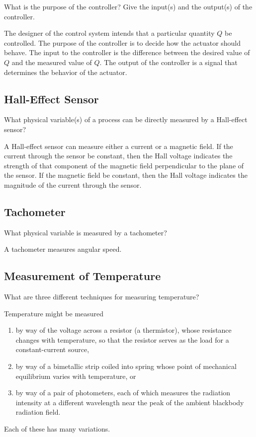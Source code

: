 \begin{prob}
   What is the purpose of the controller? Give the input(s) and the output(s)
   of the controller.
\end{prob}

The designer of the control system intends that a particular quantity $Q$ be
controlled. The purpose of the controller is to decide how the actuator should
behave. The input to the controller is the difference between the desired value
of $Q$ and the measured value of $Q$.  The output of the controller is a signal
that determines the behavior of the actuator.

\subsection{Hall-Effect Sensor}

\begin{prob}
   What physical variable(s) of a process can be directly measured by a
   Hall-effect sensor?
\end{prob}

A Hall-effect sensor can measure either a current or a magnetic field. If the
current through the sensor be constant, then the Hall voltage indicates the
strength of that component of the magnetic field perpendicular to the plane of
the sensor. If the magnetic field be constant, then the Hall voltage indicates
the magnitude of the current through the sensor.

\subsection{Tachometer}

\begin{prob}
   What physical variable is measured by a tachometer?
\end{prob}

A tachometer measures angular speed.

\subsection{Measurement of Temperature}

\begin{prob}
   What are three different techniques for measuring temperature?
\end{prob}

Temperature might be measured
\begin{enumerate}
   \item by way of the voltage across a resistor (a thermistor), whose
      resistance changes with temperature, so that the resistor serves as the
      load for a constant-current source,
   \item by way of a bimetallic strip coiled into spring whose point of
      mechanical equilibrium varies with temperature, or
   \item by way of a pair of photometers, each of which measures the radiation
      intensity at a different wavelength near the peak of the ambient
      blackbody radiation field.
\end{enumerate}
Each of these has many variations.

